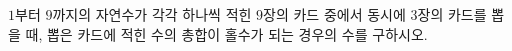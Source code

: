\hspace*{2mm}\begin{minipage}[t]{\dimexpr\linewidth-2mm\relax}\vspace{0pt}
$1$부터 $9$까지의 자연수가 각각 하나씩 적힌 $9$장의 카드 중에서 동시에 $3$장의 카드를 뽑을 때, 뽑은 카드에 적힌 수의 총합이 홀수가 되는 경우의 수를 구하시오.\end{minipage}
